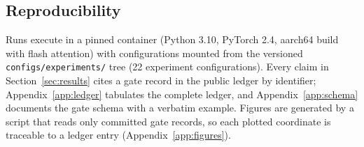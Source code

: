 \subsection{Reproducibility}

Runs execute in a pinned container (Python 3.10, PyTorch 2.4, aarch64 build with flash attention) with configurations mounted from the versioned \texttt{configs/experiments/} tree (22 experiment configurations). Every claim in Section~\ref{sec:results} cites a gate record in the public ledger by identifier; Appendix~\ref{app:ledger} tabulates the complete ledger, and Appendix~\ref{app:schema} documents the gate schema with a verbatim example. Figures are generated by a script that reads only committed gate records, so each plotted coordinate is traceable to a ledger entry (Appendix~\ref{app:figures}).
